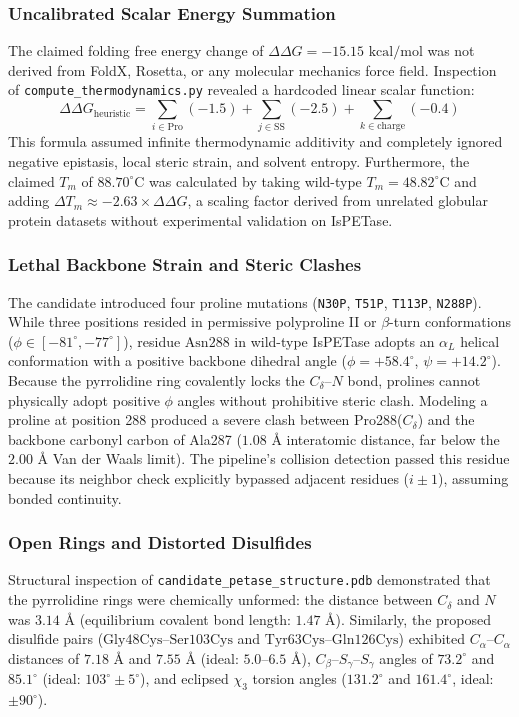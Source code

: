 \documentclass[10pt,twocolumn]{article}
\begin{document}
\subsubsection{Uncalibrated Scalar Energy Summation}
The claimed folding free energy change of $\Delta\Delta G = -15.15\text{ kcal/mol}$ was not derived from FoldX, Rosetta, or any molecular mechanics force field. Inspection of \texttt{compute\_thermodynamics.py} revealed a hardcoded linear scalar function:
\begin{equation}
    \Delta\Delta G_{\text{heuristic}} = \sum_{i \in \text{Pro}} (-1.5) + \sum_{j \in \text{SS}} (-2.5) + \sum_{k \in \text{charge}} (-0.4)
\end{equation}
This formula assumed infinite thermodynamic additivity and completely ignored negative epistasis, local steric strain, and solvent entropy. Furthermore, the claimed $T_m$ of $88.70^\circ\text{C}$ was calculated by taking wild-type $T_m = 48.82^\circ\text{C}$ and adding $\Delta T_m \approx -2.63 \times \Delta\Delta G$, a scaling factor derived from unrelated globular protein datasets without experimental validation on IsPETase.

\subsubsection{Lethal Backbone Strain and Steric Clashes}
The candidate introduced four proline mutations (\texttt{N30P}, \texttt{T51P}, \texttt{T113P}, \texttt{N288P}). While three positions resided in permissive polyproline II or $\beta$-turn conformations ($\phi \in [-81^\circ, -77^\circ]$), residue $\text{Asn288}$ in wild-type IsPETase adopts an $\alpha_L$ helical conformation with a positive backbone dihedral angle ($\phi = +58.4^\circ$, $\psi = +14.2^\circ$). Because the pyrrolidine ring covalently locks the $C_\delta\text{--}N$ bond, prolines cannot physically adopt positive $\phi$ angles without prohibitive steric clash. Modeling a proline at position 288 produced a severe clash between Pro288($C_\delta$) and the backbone carbonyl carbon of Ala287 ($1.08\text{ \AA}$ interatomic distance, far below the $2.00\text{ \AA}$ Van der Waals limit). The pipeline's collision detection passed this residue because its neighbor check explicitly bypassed adjacent residues ($i \pm 1$), assuming bonded continuity.

\subsubsection{Open Rings and Distorted Disulfides}
Structural inspection of \texttt{candidate\_petase\_structure.pdb} demonstrated that the pyrrolidine rings were chemically unformed: the distance between $C_\delta$ and $N$ was $3.14\text{ \AA}$ (equilibrium covalent bond length: $1.47\text{ \AA}$). Similarly, the proposed disulfide pairs ($\text{Gly48Cys}\text{--}\text{Ser103Cys}$ and $\text{Tyr63Cys}\text{--}\text{Gln126Cys}$) exhibited $C_\alpha\text{--}C_\alpha$ distances of $7.18\text{ \AA}$ and $7.55\text{ \AA}$ (ideal: $5.0\text{--}6.5\text{ \AA}$), $C_\beta\text{--}S_\gamma\text{--}S_\gamma$ angles of $73.2^\circ$ and $85.1^\circ$ (ideal: $103^\circ \pm 5^\circ$), and eclipsed $\chi_3$ torsion angles ($131.2^\circ$ and $161.4^\circ$, ideal: $\pm 90^\circ$).
\end{document}
